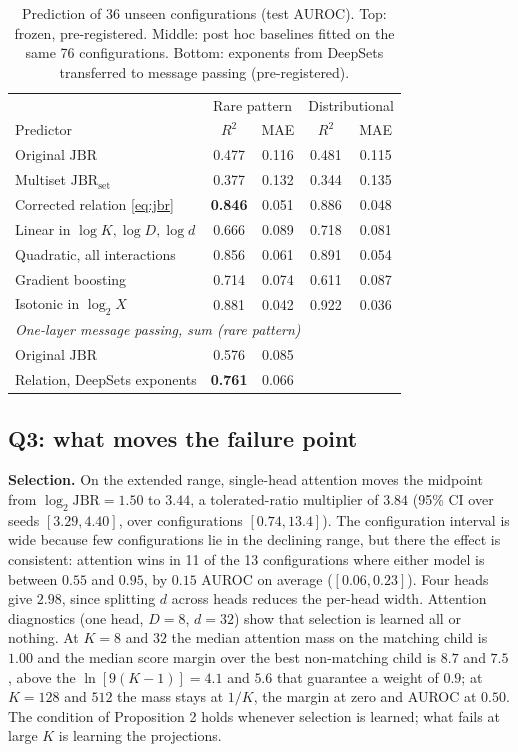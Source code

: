 \documentclass[conference]{IEEEtran}
\newcommand{\jbr}{\mathrm{JBR}}
\begin{document}
\begin{table}[t]
\caption{Prediction of 36 unseen configurations (test AUROC). Top: frozen, pre-registered. Middle: post hoc baselines fitted on the same 76 configurations. Bottom: exponents from DeepSets transferred to message passing (pre-registered).}
\label{tab:oos}
\centering
\setlength{\tabcolsep}{4pt}
\begin{tabular}{lcccc}
\toprule
& \multicolumn{2}{c}{Rare pattern} & \multicolumn{2}{c}{Distributional}\\
Predictor & $R^2$ & MAE & $R^2$ & MAE\\
\midrule
Original $\jbr$ & 0.477 & 0.116 & 0.481 & 0.115\\
Multiset $\jbr_{\mathrm{set}}$ & 0.377 & 0.132 & 0.344 & 0.135\\
Corrected relation \eqref{eq:jbr} & \textbf{0.846} & 0.051 & 0.886 & 0.048\\
\midrule
Linear in $\log K, \log D, \log d$ & 0.666 & 0.089 & 0.718 & 0.081\\
Quadratic, all interactions & 0.856 & 0.061 & 0.891 & 0.054\\
Gradient boosting & 0.714 & 0.074 & 0.611 & 0.087\\
Isotonic in $\log_2 X$ & 0.881 & 0.042 & 0.922 & 0.036\\
\midrule
\multicolumn{5}{l}{\emph{One-layer message passing, sum (rare pattern)}}\\
Original $\jbr$ & 0.576 & 0.085 & & \\
Relation, DeepSets exponents & \textbf{0.761} & 0.066 & & \\
\bottomrule
\end{tabular}
\end{table}

\subsection{Q3: what moves the failure point}
\label{sec:q3}

\textbf{Selection.} On the extended range, single-head attention moves the midpoint from $\log_2\jbr = 1.50$ to $3.44$, a tolerated-ratio multiplier of $3.84$ (95\% CI over seeds $[3.29, 4.40]$, over configurations $[0.74, 13.4]$). The configuration interval is wide because few configurations lie in the declining range, but there the effect is consistent: attention wins in 11 of the 13 configurations where either model is between $0.55$ and $0.95$, by $0.15$ AUROC on average ($[0.06, 0.23]$). Four heads give $2.98$, since splitting $d$ across heads reduces the per-head width. Attention diagnostics (one head, $D = 8$, $d = 32$) show that selection is learned all or nothing. At $K = 8$ and $32$ the median attention mass on the matching child is $1.00$ and the median score margin over the best non-matching child is $8.7$ and $7.5$, above the $\ln[9(K-1)] = 4.1$ and $5.6$ that guarantee a weight of $0.9$; at $K = 128$ and $512$ the mass stays at $1/K$, the margin at zero and AUROC at $0.50$. The condition of Proposition 2 holds whenever selection is learned; what fails at large $K$ is learning the projections.
\end{document}
